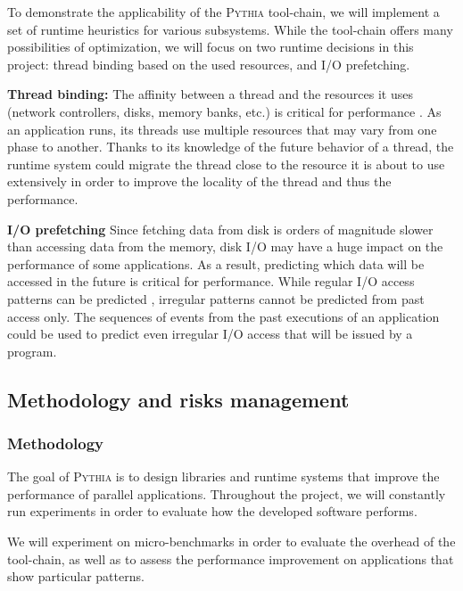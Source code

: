 \documentclass[a4paper,11pt,defblank]{article}
\newcommand{\pname}{\textsc{Pythia}\xspace}
\begin{document}
To demonstrate the applicability of the \pname tool-chain, we will
implement a set of runtime heuristics for various subsystems. While
the tool-chain offers many possibilities of optimization, we will
focus on two runtime decisions in this project: thread binding based
on the used resources, and I/O prefetching.

\textbf{Thread binding:} The affinity between a thread and the
resources it uses (network controllers, disks, memory banks, etc.) is
critical for performance \cite{nuioa}. As an application runs, its
threads use multiple resources that may vary from one phase to
another. Thanks to its knowledge of the future behavior of a thread,
the runtime system could migrate the thread close to the resource it
is about to use extensively in order to improve the locality of the
thread and thus the performance.

\textbf{I/O prefetching} Since fetching data from disk is orders of
magnitude slower than accessing data from the memory, disk I/O may
have a huge impact on the performance of some applications. As a
result, predicting which data will be accessed in the future is
critical for performance. While regular I/O access patterns can be
predicted \cite{cao1996implementation}, irregular patterns cannot be predicted
from past access only. The sequences of events from the past
executions of an application could be used to predict even irregular
I/O access that will be issued by a program.

\subsection{Methodology and risks management}

\vspace{1cm}
\subsubsection{Methodology}

The goal of \pname is to design libraries and runtime systems that
improve the performance of parallel applications. Throughout the
project, we will constantly run experiments in order to evaluate how
the developed software performs.

We will experiment on micro-benchmarks in order to evaluate the
overhead of the tool-chain, as well as to assess the performance
improvement on applications that show particular patterns.
\end{document}
